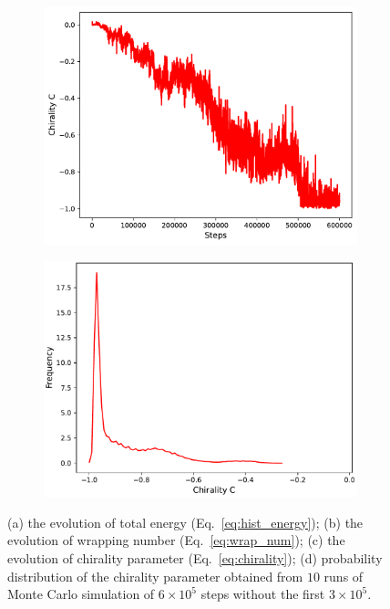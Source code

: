 \documentclass[a4paper,10pt]{article}
\begin{document}
\begin{figure}[tb]
\begin{subfigure}{.33\textwidth}
\includegraphics[width=\textwidth]{hist_chirality.pdf}
\caption{}
\label{fig:hist_ch}
\end{subfigure}
\begin{subfigure}{.33\textwidth}
\includegraphics[width=\textwidth]{hist_ch_pr.pdf}
\caption{}
\label{fig:hist_ch_pr}
\end{subfigure}
\caption{(a) the evolution of total energy (Eq.~\ref{eq:hist_energy});
(b) the evolution of wrapping number (Eq.~\ref{eq:wrap_num});
(c) the evolution of chirality parameter (Eq.~\ref{eq:chirality});
(d) probability distribution of the chirality parameter obtained from $10$ runs of Monte Carlo simulation of $6\times 10^5$ steps without the first $3\times 10^5$.}
\label{fig:hist_params}
\end{figure}
\end{document}
